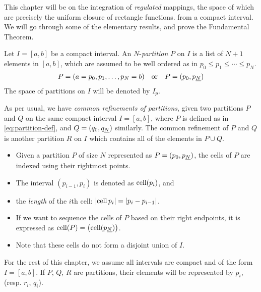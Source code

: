 \documentclass[../main-manifolds.tex]{subfiles}
\begin{document}
\newpage
{}
This chapter will be on the integration of \emph{regulated} mappings, the space of which are precisely the uniform closure of rectangle functions. from a compact interval. We will go through some of the elementary results, and prove the Fundamental Theorem.
\begin{definition}[Partition on {$[a,b]$}]
Let $I=[a,b]$ be a compact interval. An  $N$-\emph{partition} $P$ on $I$ is a list of $N+1$ elements in $[a,b]$, which are assumed to be well ordered as in $p_0\leq p_1\leq\cdots\leq p_N$. 
\begin{equation}\label{eq:partition-def}
    P = (a = p_0,p_1,\ldots,p_N = b)\qqtext{or} P = (p_0,\UL{p}[N])
\end{equation}
The space of partitions on $I$ will be denoted by $I_p$.
\end{definition}
As per usual, we have \emph{common refinements of partitions}, given two partitions $P$ and $Q$ on the same compact interval $I=[a,b]$, where $P$ is defined as in \cref{eq:partition-def}, and $Q = (q_0,\UL{q}[N])$ similarly. The common refinement of $P$ and $Q$ is another partition $R$ on $I$ which contains all of the elements in $P\cup Q$. 
\begin{itemize}
    \item Given a partition \( P \) of size \( N \) represented as \( P = (p_0, \UL{p}[N]) \), the cells of \( P \) are indexed using their rightmost points.
    \item The interval \((p_{i-1}, p_i)\) is denoted as \(\operatorname{cell}(p_i)\), and 
    \item the \emph{length} of the $i$th cell: $\abs{\operatorname{cell}{p_i}}=\abs{p_i - p_{i-1}}$.
    \item If we want to sequence the cells of \( P \) based on their right endpoints, it is expressed as \( \cell(P) = \qty(\cell(\UL{p}[N])) \).
    
    \item Note that these cells do not form a disjoint union of $I$.
\end{itemize}
\begin{remark}
For the rest of this chapter, we assume all intervals are compact and of the form $I = [a,b]$. If $P$, $Q$, $R$ are partitions, their elements will be represented by $p_i$, (resp. $r_i$, $q_i$).
\end{remark}
\end{document}
